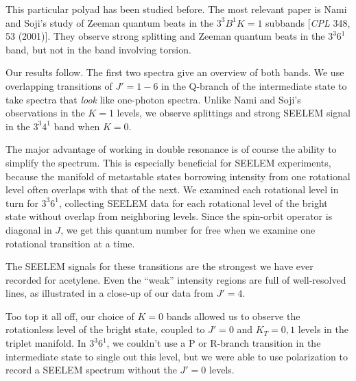 \documentclass[12pt]{mitthesis}
\begin{document}
This particular polyad has been studied before. The most relevant
paper is Nami and Soji's study of Zeeman quantum beats in the $3^3 B^1
K=1$ subbands [\emph{CPL} 348, 53 (2001)].  They observe strong
splitting and Zeeman quantum beats in the $3^3 6^1$ band, but not in
the band involving torsion.

Our results follow.  The first two spectra give an overview of both
bands.  We use overlapping transitions of $J'=1-6$ in the Q-branch of
the intermediate state to take spectra that \emph{look} like
one-photon spectra.  Unlike Nami and Soji's observations in the $K=1$
levels, we observe splittings and strong SEELEM signal in the $3^3
4^1$ band when $K=0$.

The major advantage of working in double resonance is of course the
ability to simplify the spectrum.  This is especially beneficial for
SEELEM experiments, because the manifold of metastable states
borrowing intensity from one rotational level often overlaps with that
of the next.  We examined each rotational level in turn for $3^3 6^1$,
collecting SEELEM data for each rotational level of the bright state
without overlap from neighboring levels.  Since the spin-orbit
operator is diagonal in $J$, we get this quantum number for free when
we examine one rotational transition at a time.

The SEELEM signals for these transitions are the strongest we have
ever recorded for acetylene.  Even the ``weak'' intensity regions are
full of well-resolved lines, as illustrated in a close-up of our data
from $J'=4$.

Too top it all off, our choice of $K=0$ bands allowed us to observe
the rotationless level of the bright state, coupled to $J'=0$ and
$K_T=0,1$ levels in the triplet manifold.  In $3^3 6^1$, we couldn't use
a P or R-branch transition in the intermediate state to single out
this level, but we were able to use polarization to record a SEELEM
spectrum without the $J'=0$ levels.



\end{document}
